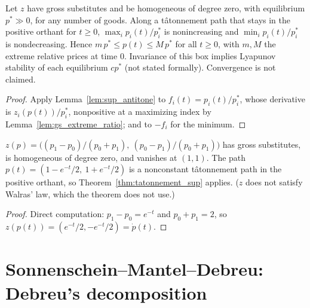 \begin{theorem}
\label{thm:tatonnement_sup}
\leanok
{}
Let $z$ have gross substitutes and be homogeneous of degree zero, with equilibrium $p^* \gg 0$, for any number of goods.
Along a tâtonnement path that stays in the positive orthant for $t \ge 0$, $\max_i p_i(t)/p^*_i$ is nonincreasing and
$\min_i p_i(t)/p^*_i$ is nondecreasing. Hence $m\,p^* \le p(t) \le M\,p^*$ for all $t \ge 0$, with $m, M$ the extreme
relative prices at time $0$. Invariance of this box implies Lyapunov stability of each equilibrium $c p^*$ (not stated
formally). Convergence is not claimed.
\end{theorem}
\begin{proof}
\leanok
Apply Lemma~\ref{lem:sup_antitone} to $f_i(t) = p_i(t)/p^*_i$, whose derivative is $z_i(p(t))/p^*_i$, nonpositive at a
maximizing index by Lemma~\ref{lem:gs_extreme_ratio}; and to $-f_i$ for the minimum.
\end{proof}

\begin{theorem}
\label{thm:tatonnement_sup_example}
\leanok
{}
$z(p) = \bigl((p_1 - p_0)/(p_0+p_1),\ (p_0 - p_1)/(p_0+p_1)\bigr)$ has gross substitutes, is homogeneous of degree zero,
and vanishes at $(1,1)$. The path $p(t) = (1 - e^{-t}/2,\ 1 + e^{-t}/2)$ is a nonconstant tâtonnement path in the
positive orthant, so Theorem~\ref{thm:tatonnement_sup} applies. ($z$ does not satisfy Walras' law, which the theorem
does not use.)
\end{theorem}
\begin{proof}
\leanok
Direct computation: $p_1 - p_0 = e^{-t}$ and $p_0 + p_1 = 2$, so $z(p(t)) = (e^{-t}/2, -e^{-t}/2) = \dot p(t)$.
\end{proof}

\section{Sonnenschein--Mantel--Debreu: Debreu's decomposition}
\label{sec:smd}


